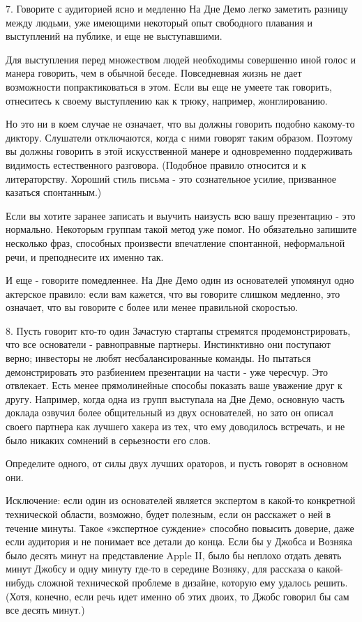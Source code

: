 \documentclass[ebook,12pt,oneside,openany]{memoir}
\begin{document}
7. Говорите с аудиторией ясно и медленно На Дне Демо легко заметить
разницу между людьми, уже имеющими некоторый опыт свободного плавания
и выступлений на публике, и еще не выступавшими.

Для выступления перед множеством людей необходимы совершенно иной
голос и манера говорить, чем в обычной беседе. Повседневная жизнь не
дает возможности попрактиковаться в этом. Если вы еще не умеете так
говорить, отнеситесь к своему выступлению как к трюку, например,
жонглированию.

Но это ни в коем случае не означает, что вы должны говорить подобно
какому-то диктору. Слушатели отключаются, когда с ними говорят таким
образом. Поэтому вы должны говорить в этой искусственной манере и
одновременно поддерживать видимость естественного разговора. (Подобное
правило относится и к литераторству. Хороший стиль письма - это
сознательное усилие, призванное казаться спонтанным.)

Если вы хотите заранее записать и выучить наизусть всю вашу
презентацию - это нормально. Некоторым группам такой метод уже помог.
Но обязательно запишите несколько фраз, способных произвести
впечатление спонтанной, неформальной речи, и преподнесите их именно
так.

И еще - говорите помедленнее. На Дне Демо один из основателей упомянул
одно актерское правило: если вам кажется, что вы говорите слишком
медленно, это означает, что вы говорите с более или менее правильной
скоростью.

8. Пусть говорит кто-то один Зачастую стартапы стремятся
продемонстрировать, что все основатели - равноправные партнеры.
Инстинктивно они поступают верно; инвесторы не любят
несбалансированные команды. Но пытаться демонстрировать это разбиением
презентации на части - уже чересчур. Это отвлекает. Есть менее
прямолинейные способы показать ваше уважение друг к другу. Например,
когда одна из групп выступала на Дне Демо, основную часть доклада
озвучил более общительный из двух основателей, но зато он описал
своего партнера как лучшего хакера из тех, что ему доводилось
встречать, и не было никаких сомнений в серьезности его слов.

Определите одного, от силы двух лучших ораторов, и пусть говорят в
основном они.

Исключение: если один из основателей является экспертом в какой-то
конкретной технической области, возможно, будет полезным, если он
расскажет о ней в течение минуты. Такое «экспертное суждение» способно
повысить доверие, даже если аудитория и не понимает все детали до
конца. Если бы у Джобса и Возняка было десять минут на представление
Apple II, было бы неплохо отдать девять минут Джобсу и одну минуту
где-то в середине Возняку, для рассказа о какой-нибудь сложной
технической проблеме в дизайне, которую ему удалось решить. (Хотя,
конечно, если речь идет именно об этих двоих, то Джобс говорил бы сам
все десять минут.)
\end{document}
